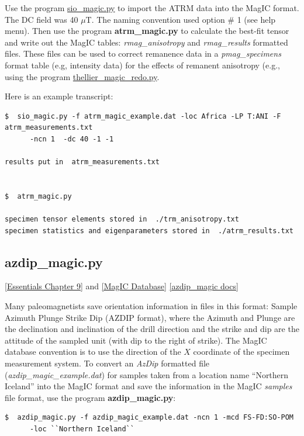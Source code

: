 \documentclass[11pt]{book}
\begin{document}
{{{Use the program \href{#sio_magic.py}{sio\_magic.py} to import the ATRM data  into the MagIC format.  The DC field was 40 $\mu$T.  The naming convention used option \# 1 (see help menu).
Then use the program {\bf atrm\_magic.py} to calculate the best-fit tensor and write out the MagIC tables: {\it rmag\_anisotropy} and {\it rmag\_results} formatted files.   These files can be used to correct remanence data in a {\it pmag\_specimens} format table (e.g, intensity data) for the effects of remanent anisotropy (e.g., using the program \href{#thellier_magic.py}{thellier\_magic\_redo.py}.

Here is an example transcript:

\begin{verbatim}
$  sio_magic.py -f atrm_magic_example.dat -loc Africa -LP T:ANI -F atrm_measurements.txt
      -ncn 1  -dc 40 -1 -1

results put in  atrm_measurements.txt


$  atrm_magic.py

specimen tensor elements stored in  ./trm_anisotropy.txt
specimen statistics and eigenparameters stored in  ./atrm_results.txt
\end{verbatim}


\subsection {azdip\_magic.py}
 \href{http://earthref.org/MAGIC/books/Tauxe/Essentials/WebBook3ch9.html#ch9}{[Essentials Chapter 9]} and \href{#MagICDatabase}{[MagIC Database]}
 \href{https://github.com/PmagPy/PmagPy/blob/master/programs/azdip_magic.py}{[azdip\_magic docs]}

Many paleomagnetists save orientation information in files in this format:
Sample  Azimuth Plunge  Strike  Dip (AZDIP format),  where the Azimuth and Plunge are the declination and inclination of the drill direction and the strike and dip are the attitude of the sampled unit (with dip to the right of strike).   The MagIC database convention is to
use the direction of the $X$ coordinate of the specimen measurement system.  To convert an  {\it AzDip} formatted file ({\it azdip_magic_example.dat}) for samples taken from a location name ``Northern Iceland''  into the MagIC format and save the information in the MagIC {\it samples}  file format, use the program {\bf azdip\_magic.py}:


\begin{verbatim}
$  azdip_magic.py -f azdip_magic_example.dat -ncn 1 -mcd FS-FD:SO-POM
      -loc ``Northern Iceland``


\end{verbatim}}}}
\end{document}
